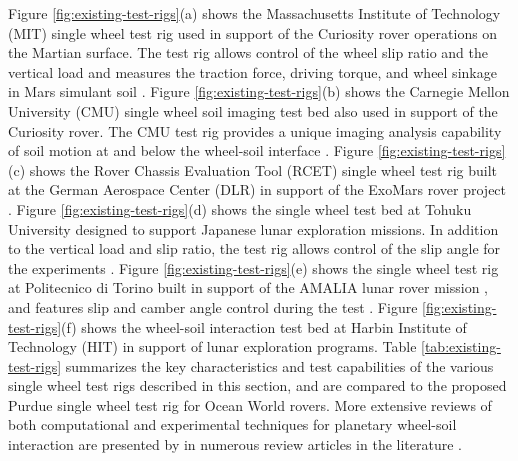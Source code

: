 \documentclass{article}
\begin{document}
Figure \ref{fig:existing-test-rigs}(a) shows the Massachusetts Institute of Technology (MIT) single wheel test rig used in support of the Curiosity rover operations on the Martian surface. The test rig allows control of the wheel slip ratio and the vertical load and measures the traction force, driving torque, and wheel sinkage in Mars simulant soil \cite{senatore2014modeling}. Figure \ref{fig:existing-test-rigs}(b) shows the Carnegie Mellon University (CMU) single wheel soil imaging test bed also used in support of the Curiosity rover. The CMU test rig provides a unique imaging  analysis capability of soil motion at and below the wheel-soil interface \cite{moreland2012soil}. Figure \ref{fig:existing-test-rigs}(c) shows the Rover Chassis Evaluation Tool (RCET) single wheel test rig built at the German Aerospace Center (DLR) in support of the ExoMars rover project \cite{gallina2014parameter}.  Figure \ref{fig:existing-test-rigs}(d) shows the single wheel test bed at Tohuku University designed to support Japanese lunar exploration missions. In addition to the vertical load and slip ratio, the test rig allows control of the slip angle for the experiments \cite{ishigami2008terramechanics}. Figure \ref{fig:existing-test-rigs}(e) shows the single wheel test rig at Politecnico di Torino built in support of the AMALIA lunar rover mission \cite{della2010amalia}, and features slip and camber angle control during the test \cite{genta2016testing}. Figure \ref{fig:existing-test-rigs}(f) shows the wheel-soil interaction test bed at Harbin Institute of Technology (HIT) in support of lunar exploration programs. Table \ref{tab:existing-test-rigs} summarizes the key characteristics and test capabilities of the various single wheel test rigs described in this section, and are compared to the proposed Purdue single wheel test rig for Ocean World rovers. More extensive reviews of both computational and experimental techniques for planetary wheel-soil interaction  are presented by in numerous review articles in the literature \cite{ding2011planetary,schafer2010planetary,sreenivasulu2014terramechanics}.
\end{document}
